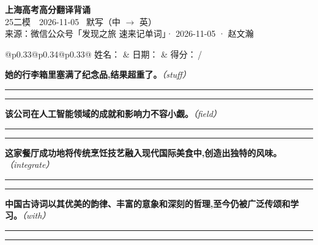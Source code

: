 \documentclass[11pt,a4paper]{article}
\newcommand{\num}[1]{\makebox[1.9em][r]{#1.}\hspace{0.3em}}
\newcommand{\wline}{\noindent\rule{\linewidth}{0.4pt}}
\newcommand{\prompt}[1]{\emph{\textcolor{tipblue}{\small（#1）}}}
\begin{document}
\pagestyle{plain}
\begin{center}
{\LARGE\bfseries 上海高考高分翻译背诵 }\\[0.25em]
{\large 25二模　2026-11-05 \quad\ 默写（中 $\to$ 英）}\\[0.35em]
{\footnotesize 来源：微信公众号「发现之旅 速来记单词」· 2026-11-05 · 赵文瀚}
\end{center}

\vspace{0.4em}
\noindent\begin{tabular}{@{}p{0.33\textwidth}@{}p{0.34\textwidth}@{}p{0.33\textwidth}@{}}
姓名：\underline{\hspace{2.0cm}} & 日期：\underline{\hspace{2.0cm}} & 得分：\underline{\hspace{1.4cm}}\,/ \\
\end{tabular}

\vspace{0.5em}

\vspace{0.8em}
\num{1}\textbf{她的行李箱里塞满了纪念品,结果超重了。}\prompt{stuff}

\vspace{0.3em}

\wline\vspace{0.3em}
\wline

\num{2}\textbf{该公司在人工智能领域的成就和影响力不容小觑。}\prompt{field}

\vspace{0.3em}

\wline\vspace{0.3em}
\wline

\num{3}\textbf{这家餐厅成功地将传统烹饪技艺融入现代国际美食中,创造出独特的风味。}\prompt{integrate}

\vspace{0.3em}

\wline\vspace{0.3em}
\wline

\num{4}\textbf{中国古诗词以其优美的韵律、丰富的意象和深刻的哲理,至今仍被广泛传颂和学习。}\prompt{with}

\vspace{0.3em}

\wline\vspace{0.3em}
\wline
\end{document}
